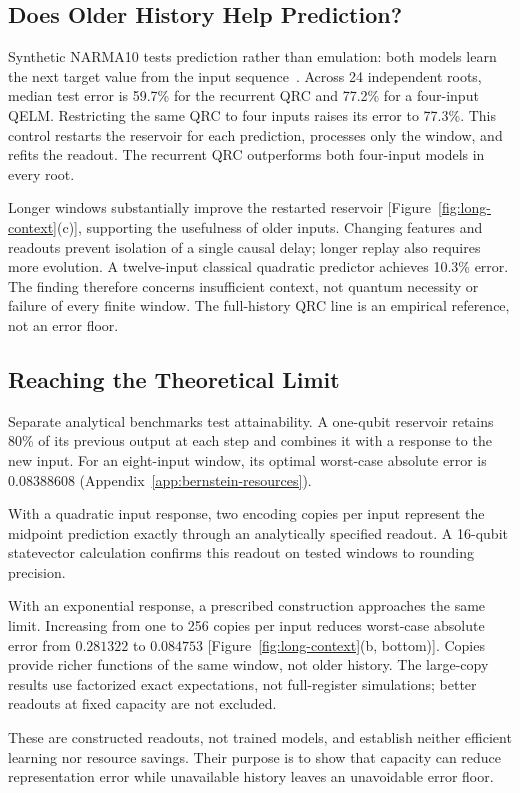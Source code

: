 \subsection{Does Older History Help Prediction?}

Synthetic NARMA10 tests prediction rather than emulation: both models learn
the next target value from the input sequence~\cite{fujii2017harnessing}.
Across 24 independent roots, median test error is 59.7\% for the recurrent
QRC and 77.2\% for a four-input QELM. Restricting the same QRC to four inputs
raises its error to 77.3\%. This control restarts the reservoir for each
prediction, processes only the window, and refits the readout. The recurrent
QRC outperforms both four-input models in every root.

Longer windows substantially improve the restarted reservoir
[Figure~\ref{fig:long-context}(c)], supporting the usefulness of older inputs.
Changing features and readouts prevent isolation of a single causal delay;
longer replay also requires more evolution. A twelve-input classical
quadratic predictor achieves 10.3\% error. The finding therefore concerns
insufficient context, not quantum necessity or failure of every finite
window. The full-history QRC line is an empirical reference, not an error floor.

\subsection{Reaching the Theoretical Limit}
\label{sec:sharpness}

Separate analytical benchmarks test attainability. A one-qubit reservoir
retains 80\% of its previous output at each step and combines it with a
response to the new input. For an eight-input window, its optimal worst-case
absolute error is $0.08388608$ (Appendix~\ref{app:bernstein-resources}).

With a quadratic input response, two encoding copies per input represent
the midpoint prediction exactly through an analytically specified readout.
A 16-qubit statevector calculation confirms this readout on tested windows
to rounding precision.

With an exponential response, a prescribed construction approaches the same
limit. Increasing from one to 256 copies per input reduces worst-case
absolute error from $0.281322$ to $0.084753$
[Figure~\ref{fig:long-context}(b, bottom)]. Copies provide richer functions
of the same window, not older history. The large-copy results use factorized
exact expectations, not full-register simulations; better readouts at fixed
capacity are not excluded.

These are constructed readouts, not trained models, and establish neither
efficient learning nor resource savings. Their purpose is to show that
capacity can reduce representation error while unavailable history leaves
an unavoidable error floor.
